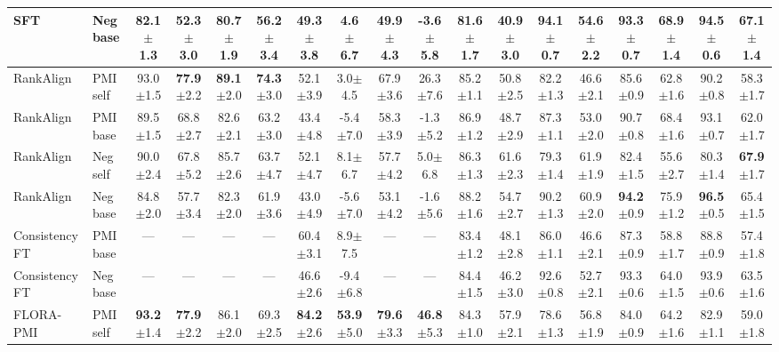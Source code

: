 \documentclass[10pt]{article}
\newcommand{\stdv}[1]{{\tiny$\pm$#1}}
\begin{document}
\begin{center}
{\begin{tabular}{ll cccc cccc cccc cccc}
SFT & Neg base & 82.1\stdv{1.3} & 52.3\stdv{3.0} & 80.7\stdv{1.9} & 56.2\stdv{3.4} & 49.3\stdv{3.8} & 4.6\stdv{6.7} & 49.9\stdv{4.3} & -3.6\stdv{5.8} & 81.6\stdv{1.7} & 40.9\stdv{3.0} & \textbf{94.1}\stdv{0.7} & 54.6\stdv{2.2} & 93.3\stdv{0.7} & 68.9\stdv{1.4} & 94.5\stdv{0.6} & 67.1\stdv{1.4} \\
\midrule
RankAlign & PMI self & 93.0\stdv{1.5} & \textbf{77.9}\stdv{2.2} & \textbf{89.1}\stdv{2.0} & \textbf{74.3}\stdv{3.0} & 52.1\stdv{3.9} & 3.0\stdv{4.5} & 67.9\stdv{3.6} & 26.3\stdv{7.6} & 85.2\stdv{1.1} & 50.8\stdv{2.5} & 82.2\stdv{1.3} & 46.6\stdv{2.1} & 85.6\stdv{0.9} & 62.8\stdv{1.6} & 90.2\stdv{0.8} & 58.3\stdv{1.7} \\
RankAlign & PMI base & 89.5\stdv{1.5} & 68.8\stdv{2.7} & 82.6\stdv{2.1} & 63.2\stdv{3.0} & 43.4\stdv{4.8} & -5.4\stdv{7.0} & 58.3\stdv{3.9} & -1.3\stdv{5.2} & 86.9\stdv{1.2} & 48.7\stdv{2.9} & 87.3\stdv{1.1} & 53.0\stdv{2.0} & 90.7\stdv{0.8} & 68.4\stdv{1.6} & 93.1\stdv{0.7} & 62.0\stdv{1.7} \\
RankAlign & Neg self & 90.0\stdv{2.4} & 67.8\stdv{5.2} & 85.7\stdv{2.6} & 63.7\stdv{4.7} & 52.1\stdv{4.7} & 8.1\stdv{6.7} & 57.7\stdv{4.2} & 5.0\stdv{6.8} & 86.3\stdv{1.3} & 61.6\stdv{2.3} & 79.3\stdv{1.4} & 61.9\stdv{1.9} & 82.4\stdv{1.5} & 55.6\stdv{2.7} & 80.3\stdv{1.4} & \textbf{67.9}\stdv{1.7} \\
RankAlign & Neg base & 84.8\stdv{2.0} & 57.7\stdv{3.4} & 82.3\stdv{2.0} & 61.9\stdv{3.6} & 43.0\stdv{4.9} & -5.6\stdv{7.0} & 53.1\stdv{4.2} & -1.6\stdv{5.6} & 88.2\stdv{1.6} & 54.7\stdv{2.7} & 90.2\stdv{1.3} & 60.9\stdv{2.0} & \textbf{94.2}\stdv{0.9} & 75.9\stdv{1.2} & \textbf{96.5}\stdv{0.5} & 65.4\stdv{1.5} \\
\midrule
Consistency FT & PMI base & --- & --- & --- & --- & 60.4\stdv{3.1} & 8.9\stdv{7.5} & --- & --- & 83.4\stdv{1.2} & 48.1\stdv{2.8} & 86.0\stdv{1.1} & 46.6\stdv{2.1} & 87.3\stdv{0.9} & 58.8\stdv{1.7} & 88.8\stdv{0.9} & 57.4\stdv{1.8} \\
Consistency FT & Neg base & --- & --- & --- & --- & 46.6\stdv{2.6} & -9.4\stdv{6.8} & --- & --- & 84.4\stdv{1.5} & 46.2\stdv{3.0} & 92.6\stdv{0.8} & 52.7\stdv{2.1} & 93.3\stdv{0.6} & 64.0\stdv{1.5} & 93.9\stdv{0.6} & 63.5\stdv{1.6} \\
\midrule
FLORA-PMI & PMI self & \textbf{93.2}\stdv{1.4} & \textbf{77.9}\stdv{2.2} & 86.1\stdv{2.0} & 69.3\stdv{2.5} & \textbf{84.2}\stdv{2.6} & \textbf{53.9}\stdv{5.0} & \textbf{79.6}\stdv{3.3} & \textbf{46.8}\stdv{5.3} & 84.3\stdv{1.0} & 57.9\stdv{2.1} & 78.6\stdv{1.3} & 56.8\stdv{1.9} & 84.0\stdv{0.9} & 64.2\stdv{1.6} & 82.9\stdv{1.1} & 59.0\stdv{1.8} \\

\end{tabular}}
\end{center}
\end{document}
